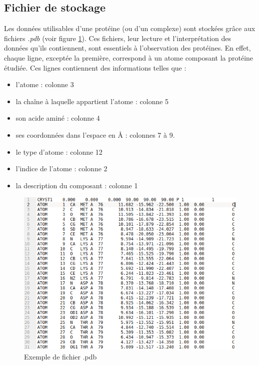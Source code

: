 \subsection*{Fichier de stockage}

Les données utilisables d'une protéine (ou d'un complexe) sont stockées grâce aux
fichiers \textit{.pdb} (voir figure \ref{fig::pdb_file}). Ces fichiers, leur lecture et l'interprétation des données
qu'ils contiennent, sont essentiels à l'observation des protéines. En effet, chaque
ligne, exceptée la première, correspond à un atome composant la protéine étudiée.
Ces lignes contiennent des informations telles que :
\begin{itemize}
  \item l'atome : colonne 3
  \item la chaîne à laquelle appartient l'atome : colonne 5
  \item son acide aminé : colonne 4
  \item ses coordonnées dans l'espace en $\si{\angstrom}$ : colonnes 7 à 9.
  \item le type d'atome : colonne 12
  \item l'indice de l'atome : colonne 2
  \item la description du composant : colonne 1
\end{itemize}


\begin{figure}[ht]
  \includegraphics[width=\textwidth]{figures/pdb_example.png}
  \caption{Exemple de fichier .pdb}
  \label{fig::pdb_file}
\end{figure}

